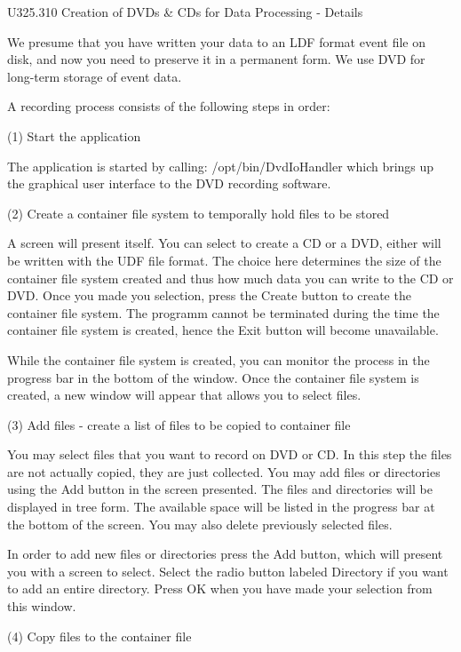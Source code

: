  
   U325.310  Creation of DVDs & CDs for Data Processing - Details
 
   We presume that you have written your data to an LDF format event  file  on
   disk,  and  now you need to preserve it in a permanent form. We use DVD for
   long-term storage of event data.
 
   A recording process consists of the following steps in order:
 
   (1) Start the application
 
   The application is started by calling: /opt/bin/DvdIoHandler  which  brings
   up the graphical user interface to the DVD recording software.
 
   (2) Create a container file system to temporally hold files to be stored
 
   A  screen  will  present  itself.   You can select to create a CD or a DVD,
   either  will  be  written  with  the  UDF  file  format.  The  choice  here
   determines  the size of the container file system created and thus how much
   data you can write to the CD or DVD. Once you  made  you  selection,  press
   the  Create button to create the container file system. The programm cannot
   be terminated during the time the container file system is  created,  hence
   the Exit button will become unavailable.
 
   While  the container file system is created, you can monitor the process in
   the progress bar in the bottom of  the  window.  Once  the  container  file
   system  is  created,  a  new  window  will appear that allows you to select
   files.
 
   (3) Add files - create a list of files to be copied to container file
 
   You may select files that you want to record on DVD or  CD.  In  this  step
   the  files  are  not  actually copied, they are just collected. You may add
   files or directories using the Add button in  the  screen  presented.   The
   files  and directories will be displayed in tree form.  The available space
   will be listed in the progress bar at the bottom of  the  screen.  You  may
   also delete previously selected files.
 
   In  order  to add new files or directories press the Add button, which will
   present you with a screen to  select.   Select  the  radio  button  labeled
   Directory  if  you  want to add an entire directory. Press OK when you have
   made your selection from this window.
 
   (4) Copy files to the container file
 
